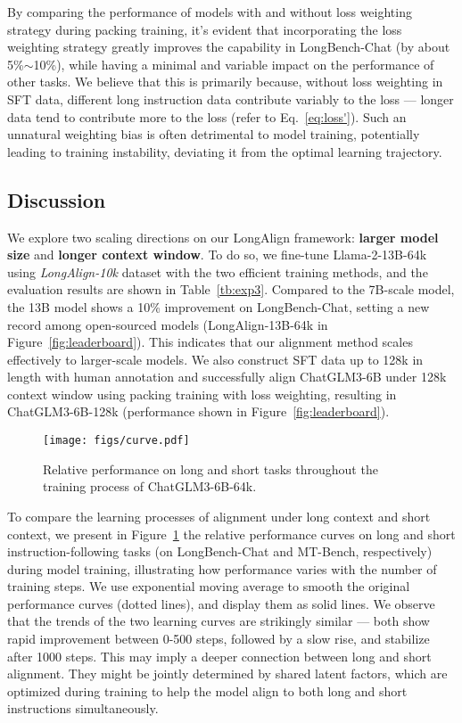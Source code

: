 By comparing the performance of models with and without loss weighting strategy during packing training, it's evident that incorporating the loss weighting strategy greatly improves the capability in LongBench-Chat (by about 5\%$\sim$10\%), while having a minimal and variable impact on the performance of other tasks.
We believe that this is primarily because, without loss weighting in SFT data, different long instruction data contribute variably to the loss --- longer data tend to contribute more to the loss (refer to Eq.~\ref{eq:loss'}). 
Such an unnatural weighting bias is often detrimental to model training, potentially leading to training instability, deviating it from the optimal learning trajectory.

\subsection{Discussion}
We explore two scaling directions on our LongAlign framework: \textbf{larger model size} and \textbf{longer context window}.
To do so, we fine-tune Llama-2-13B-64k using \emph{LongAlign-10k} dataset with the two efficient training methods, and the evaluation results are shown in Table~\ref{tb:exp3}.
Compared to the 7B-scale model, the 13B model shows a 10\% improvement on LongBench-Chat, setting a new record among open-sourced models (LongAlign-13B-64k in Figure~\ref{fig:leaderboard}).
This indicates that our alignment method scales effectively to larger-scale models.
We also construct SFT data up to 128k in length with human annotation and successfully align ChatGLM3-6B under 128k context window using packing training with loss weighting, resulting in ChatGLM3-6B-128k (performance shown in Figure~\ref{fig:leaderboard}).

\begin{figure}[t]
    \centering
    \texttt{[image: figs/curve.pdf]}
    \caption{Relative performance on long and short tasks throughout the training process of ChatGLM3-6B-64k.}
    \label{fig:curve}
\end{figure}

To compare the learning processes of alignment under long context and short context, we present in Figure~\ref{fig:curve} the relative performance curves on long and short instruction-following tasks (on LongBench-Chat and MT-Bench, respectively) during model training, illustrating how performance varies with the number of training steps.
We use exponential moving average to smooth the original performance curves (dotted lines), and display them as solid lines.
We observe that the trends of the two learning curves are strikingly similar --- both show rapid improvement between 0-500 steps, followed by a slow rise, and stabilize after 1000 steps. 
This may imply a deeper connection between long and short alignment. 
They might be jointly determined by shared latent factors, which are optimized during training to help the model align to both long and short instructions simultaneously.

